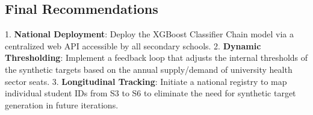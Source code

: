 \subsection{Final Recommendations}
1. \textbf{National Deployment}: Deploy the XGBoost \parencite{chen2016xgboost} Classifier Chain \parencite{read2011classifier} model via a centralized web API accessible by all secondary schools.
2. \textbf{Dynamic Thresholding}: Implement a feedback loop that adjusts the internal thresholds of the synthetic targets based on the annual supply/demand of university health sector seats.
3. \textbf{Longitudinal Tracking}: Initiate a national registry to map individual student IDs from S3 to S6 to eliminate the need for synthetic target generation in future iterations.


